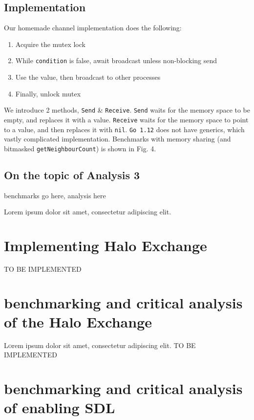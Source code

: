 \documentclass[twoside,twocolumn]{article}
\begin{document}
\subsection{Implementation}
Our homemade channel implementation does the following:
\begin{enumerate}[noitemsep]
  \item Acquire the mutex lock
  \item While \texttt{condition} is false, await broadcast unless non-blocking send
  \item Use the value, then broadcast to other processes
  \item Finally, unlock mutex
\end{enumerate}
We introduce 2 methods, \texttt{Send} \& \texttt{Receive}. \texttt{Send} waits for the memory space 
to be empty, and replaces it with a value. \texttt{Receive} waits for the memory space to point to a value, and then 
replaces it with \texttt{nil}. \texttt{Go 1.12} does not have generics, which vastly complicated implementation. 
Benchmarks with memory sharing (and bitmasked \texttt{getNeighbourCount}) is shown in Fig. 4.
\subsection{On the topic of Analysis 3}
benchmarks go here, analysis here

Lorem ipsum dolor sit amet, consectetur adipiscing elit.
\blindtext %




\section{Implementing Halo Exchange}

TO BE IMPLEMENTED

\section{benchmarking and critical analysis of the Halo Exchange}

\lettrine[nindent=0em,lines=3]{L} orem ipsum dolor sit amet, consectetur adipiscing elit.
TO BE IMPLEMENTED

\section{benchmarking and critical analysis of enabling SDL}
\end{document}
